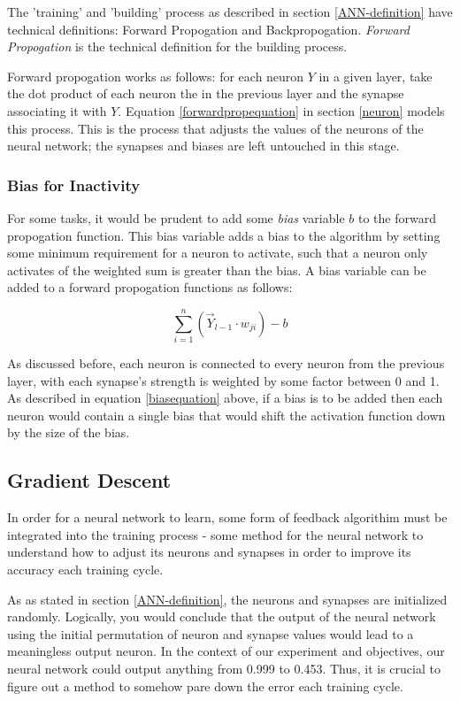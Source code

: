 \documentclass[12pt]{article}
\begin{document}
The 'training' and 'building' process as described in section \ref{ANN-definition} have technical definitions: Forward Propogation and Backpropogation. \textit{Forward Propogation} is the technical definition for the building process.

Forward propogation works as follows: for each neuron \(Y\) in a given layer, take the dot product of each neuron the in the previous layer and the synapse associating it with \(Y\). Equation \ref{forwardpropequation} in section \ref{neuron} models this process. This is the process that adjusts the values of the neurons of the neural network; the synapses and biases are left untouched in this stage.

\subsubsection{Bias for Inactivity}
For some tasks, it would be prudent to add some \textit{bias} variable \(b\) to the forward propogation function. This bias variable adds a bias to the algorithm by setting some minimum requirement for a neuron to activate, such that a neuron only activates of the weighted sum is greater than the bias. A bias variable can be added to a forward propogation functions as follows:

\begin{equation} \label{biasequation}
    \sum_{i=1}^{n}(\vec Y_{l-1} \cdot  w_{ji}) -b
\end{equation}

As discussed before, each neuron is connected to every neuron from the previous layer, with each synapse's strength is weighted by some factor between 0 and 1. As described in equation \ref{biasequation} above, if a bias is to be added then each neuron would contain a single bias that would shift the activation function down by the size of the bias.


\subsection{Gradient Descent \label{gradient-descent}}

In order for a neural network to learn, some form of feedback algorithim must be integrated into the training process - some method for the neural network to understand how to adjust its neurons and synapses in order to improve its accuracy each training cycle.

As as stated in section \ref{ANN-definition}, the neurons and synapses are initialized randomly. Logically, you would conclude that the output of the neural network using the initial permutation of neuron and synapse values would lead to a meaningless output neuron. In the context of our experiment and objectives, our neural network could output anything from 0.999 to 0.453. Thus, it is crucial to figure out a method to somehow pare down the error each training cycle.
\end{document}
